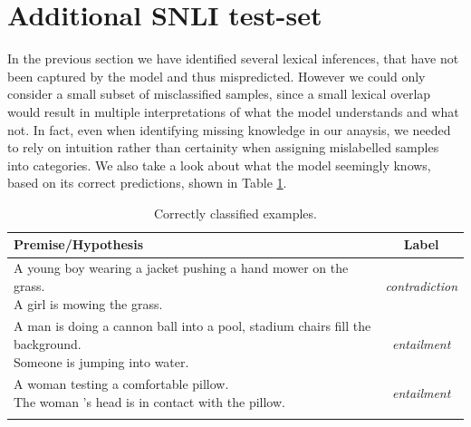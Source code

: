 \section{Additional SNLI test-set}\label{sec:additional_snli_set}
In the previous section we have identified several lexical inferences, that have not been captured by the model and thus mispredicted.  However we could only consider a small subset of misclassified samples, since a small lexical overlap would result in multiple interpretations of what the model understands and what not. In fact, even when identifying missing knowledge in our anaysis, we needed to rely on intuition rather than certainity when assigning mislabelled samples into categories. We also take a look about what the model seemingly knows, based on its correct predictions, shown in Table \ref{table:correct_samples}.
\begin{table}[!htbp]
\begin{center}
\begin{tabular}{lc}
\textbf{Premise/Hypothesis} & \textbf{Label} \\
\toprule
\specialcell{A young boy wearing a jacket pushing a hand mower on the grass.\\A girl is mowing the grass.} & \textit{contradiction} \\
\midrule
\specialcell{A man is doing a cannon ball into a pool, stadium chairs fill the background.\\Someone is jumping into water.} & \textit{entailment} \\
\midrule
\specialcell{A woman testing a comfortable pillow.\\The woman 's head is in contact with the pillow.} & \textit{entailment} \\
\bottomrule
\label{table:correct_samples}
\end{tabular}
\caption{Correctly classified examples.}
\end{center}
\end{table}
